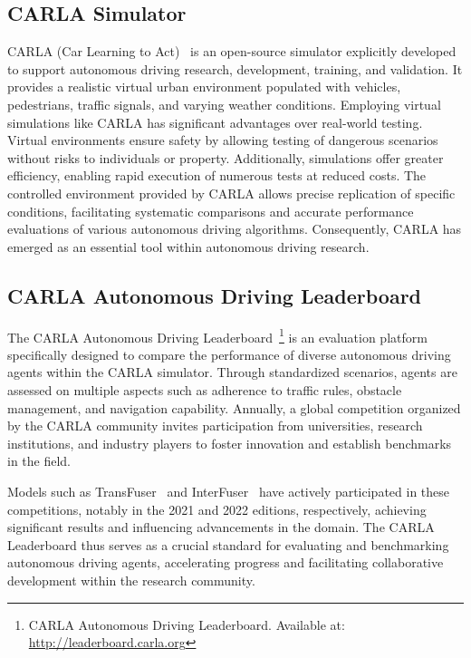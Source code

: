 \subsection{CARLA Simulator}
CARLA (Car Learning to Act)~\cite{dosovitskiy2017carlaopenurbandriving} is an open-source simulator explicitly developed to support autonomous driving research, development, training, and validation. It provides a realistic virtual urban environment populated with vehicles, pedestrians, traffic signals, and varying weather conditions. Employing virtual simulations like CARLA has significant advantages over real-world testing. Virtual environments ensure safety by allowing testing of dangerous scenarios without risks to individuals or property. Additionally, simulations offer greater efficiency, enabling rapid execution of numerous tests at reduced costs. The controlled environment provided by CARLA allows precise replication of specific conditions, facilitating systematic comparisons and accurate performance evaluations of various autonomous driving algorithms. Consequently, CARLA has emerged as an essential tool within autonomous driving research.

\subsection{CARLA Autonomous Driving Leaderboard}
The CARLA Autonomous Driving Leaderboard~\footnote{CARLA Autonomous Driving Leaderboard. Available at: \url{http://leaderboard.carla.org}} is an evaluation platform specifically designed to compare the performance of diverse autonomous driving agents within the CARLA simulator. Through standardized scenarios, agents are assessed on multiple aspects such as adherence to traffic rules, obstacle management, and navigation capability. Annually, a global competition organized by the CARLA community invites participation from universities, research institutions, and industry players to foster innovation and establish benchmarks in the field.

Models such as TransFuser~\cite{chitta2022transfuserimitationtransformerbasedsensor} and InterFuser~\cite{shao2022safetyenhancedautonomousdrivingusing} have actively participated in these competitions, notably in the 2021 and 2022 editions, respectively, achieving significant results and influencing advancements in the domain. The CARLA Leaderboard thus serves as a crucial standard for evaluating and benchmarking autonomous driving agents, accelerating progress and facilitating collaborative development within the research community.

